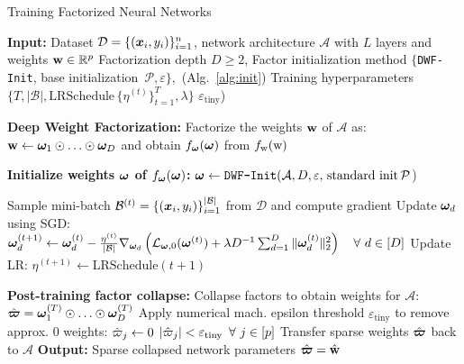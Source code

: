 
\begin{algorithm}
\small
\caption{\small Training Factorized Neural Networks}
\begin{algorithmic}[1]\label{alg:train}
\STATE \textbf{Input:} 
\STATE \quad Dataset $\mathcal{D} = \{(\bm{x}_i, y_i)\}_{i=1}^n$, network architecture $\mathcal{A}$ with $L$ layers and weights $\mathbf{w} \in \mathbb{R}^p$
\STATE \quad Factorization depth $D \geq 2$, 
\STATE \quad Factor initialization method $\{$\texttt{DWF-Init}, base initialization~$\mathcal{P},\varepsilon\}$,\, (Alg.~\ref{alg:init})
\STATE \quad Training hyperparameters $\{T, |\mathcal{B}|, \text{LRSchedule}\, \{\eta^{(t)}\}_{t=1}^{T}, \lambda \}$
\STATE \quad $\varepsilon_{\text{tiny}}$) %

\STATE \textbf{Deep Weight Factorization:}
\STATE \quad Factorize the weights $\mathbf{w}$ of $\mathcal{A}$ as:
\STATE \quad $\mathbf{w} \leftarrow \bm{\omega}_1 \odot \ldots \odot \bm{\omega}_D$ and obtain $f_{\bm{\omega}}(\bm{\omega})$ from $f_{\mathrm{w}}(\mathrm{w})$

\STATE \textbf{Initialize weights $\bm{\omega}$ of $f_{\bm{\omega}}(\bm{\omega})$:}
\STATE \quad $\bm{\omega} \leftarrow \texttt{DWF-Init}(\mathcal{A}, D, \varepsilon,\, \text{standard init}\,\mathcal{P}$)

    \STATE Sample mini-batch $\mathcal{B}^{(t)}=\{(\bm{x}_i, y_i)\}_{i=1}^{|\mathcal{B}|}$ from $\mathcal{D}$ and compute gradient 
    \STATE Update $\bm{\omega}_d$ using SGD:
    \STATE \quad $\bm{\omega}_d^{(t+1)} \leftarrow \bm{\omega}_d^{(t)} - \frac{\eta^{(t)}}{|\mathcal{B}|} \nabla_{\bm{\omega}_d} \left( \mathcal{L}_{\bm{\omega},0}(\bm{\omega}^{(t)}) + \lambda D^{-1} \sum_{d=1}^{D} \|\bm{\omega}_d^{(t)}\|_2^2 \right) \quad \forall \,\, d \in [D]$
    \STATE Update LR:
    \STATE \quad $\eta^{(t+1)} \leftarrow \text{LRSchedule}(t+1)$
\ENDFOR

\STATE \textbf{Post-training factor collapse:}
\STATE \quad Collapse factors to obtain weights for $\mathcal{A}$:
\STATE \quad $\hat{\bm{\varpi}} = \bm{\omega}_1^{(T)} \odot \ldots \odot \bm{\omega}_D^{(T)}$
\STATE \quad Apply numerical mach. epsilon threshold $\varepsilon_{\text{tiny}}$ to remove approx. $0$ weights:
\STATE \quad $\hat{\varpi}_j \leftarrow 0$  $|\hat{\varpi}_j| < \varepsilon_{\text{tiny}} \,\,\, \forall \,\, j \in [p]$
\STATE \quad Transfer sparse weights $\hat{\bm{\varpi}}$ back to $\mathcal{A}$
\STATE \textbf{Output:} 
\STATE \quad Sparse collapsed network parameters $\hat{\bm{\varpi}}=\hat{\mathbf{w}}$

\end{algorithmic}
\end{algorithm}